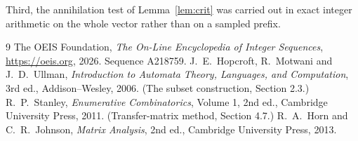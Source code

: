 \documentclass[11pt,a4paper]{article}
\theoremstyle{plain}
\theoremstyle{definition}
\begin{document}
Third, the annihilation test of Lemma~\ref{lem:crit} was carried out in exact integer
arithmetic on the whole vector rather than on a sampled prefix.

\begin{thebibliography}{9}
 The OEIS Foundation, \emph{The On-Line Encyclopedia of Integer
Sequences}, \url{https://oeis.org}, 2026. Sequence A218759.
 J.~E.~Hopcroft, R.~Motwani and J.~D.~Ullman, \emph{Introduction to Automata
Theory, Languages, and Computation}, 3rd ed., Addison--Wesley, 2006. (The subset
construction, Section 2.3.)
 R.~P.~Stanley, \emph{Enumerative Combinatorics}, Volume 1, 2nd ed.,
Cambridge University Press, 2011. (Transfer-matrix method, Section 4.7.)
 R.~A.~Horn and C.~R.~Johnson, \emph{Matrix Analysis}, 2nd ed., Cambridge
University Press, 2013.
\end{thebibliography}
\end{document}
